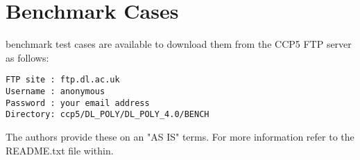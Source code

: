 \section{Benchmark Cases}

\D benchmark test cases are available to download them from the CCP5 FTP
server as follows:

\begin{verbatim}
FTP site : ftp.dl.ac.uk
Username : anonymous
Password : your email address
Directory: ccp5/DL_POLY/DL_POLY_4.0/BENCH
\end{verbatim}

The \D authors provide these on an "AS IS" terms.  For more information
refer to the README.txt file within.

